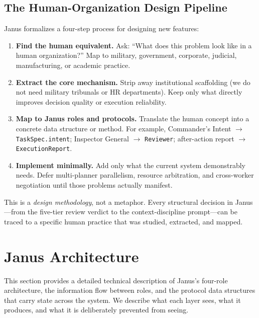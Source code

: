 \documentclass[11pt,a4paper]{article}
\begin{document}
\subsection{The Human-Organization Design Pipeline}

Janus formalizes a four-step process for designing new features:

\begin{enumerate}[leftmargin=*,itemsep=2pt]
    \item \textbf{Find the human equivalent.} Ask: ``What does this problem
    look like in a human organization?'' Map to military, government,
    corporate, judicial, manufacturing, or academic practice.
    \item \textbf{Extract the core mechanism.} Strip away institutional
    scaffolding (we do not need military tribunals or HR departments).
    Keep only what directly improves decision quality or execution
    reliability.
    \item \textbf{Map to Janus roles and protocols.} Translate the human
    concept into a concrete data structure or method. For example, Commander's
    Intent $\rightarrow$ \texttt{TaskSpec.intent}; Inspector General
    $\rightarrow$ \texttt{Reviewer}; after-action report $\rightarrow$
    \texttt{ExecutionReport}.
    \item \textbf{Implement minimally.} Add only what the current system
    demonstrably needs. Defer multi-planner parallelism, resource arbitration,
    and cross-worker negotiation until those problems actually manifest.
\end{enumerate}

This is a \emph{design methodology}, not a metaphor. Every structural
decision in Janus---from the five-tier review verdict to the context-discipline
prompt---can be traced to a specific human practice that was studied, extracted,
and mapped.

\section{Janus Architecture}

This section provides a detailed technical description of Janus's four-role
architecture, the information flow between roles, and the protocol data
structures that carry state across the system. We describe what each layer
sees, what it produces, and what it is deliberately prevented from seeing.
\end{document}
